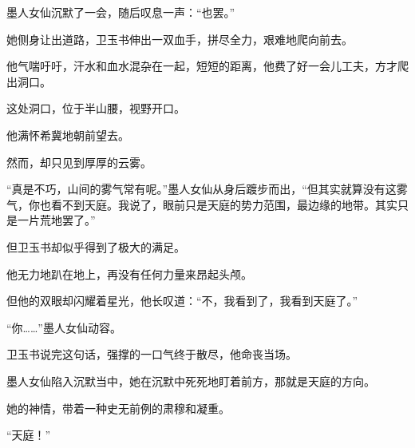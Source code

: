 \begin{this_body}
墨人女仙沉默了一会，随后叹息一声：“也罢。”

她侧身让出道路，卫玉书伸出一双血手，拼尽全力，艰难地爬向前去。

他气喘吁吁，汗水和血水混杂在一起，短短的距离，他费了好一会儿工夫，方才爬出洞口。

这处洞口，位于半山腰，视野开口。

他满怀希冀地朝前望去。

然而，却只见到厚厚的云雾。

“真是不巧，山间的雾气常有呢。”墨人女仙从身后踱步而出，“但其实就算没有这雾气，你也看不到天庭。我说了，眼前只是天庭的势力范围，最边缘的地带。其实只是一片荒地罢了。”

但卫玉书却似乎得到了极大的满足。

他无力地趴在地上，再没有任何力量来昂起头颅。

但他的双眼却闪耀着星光，他长叹道：“不，我看到了，我看到天庭了。”

“你……”墨人女仙动容。

卫玉书说完这句话，强撑的一口气终于散尽，他命丧当场。

墨人女仙陷入沉默当中，她在沉默中死死地盯着前方，那就是天庭的方向。

她的神情，带着一种史无前例的肃穆和凝重。

“天庭！”

\end{this_body}

